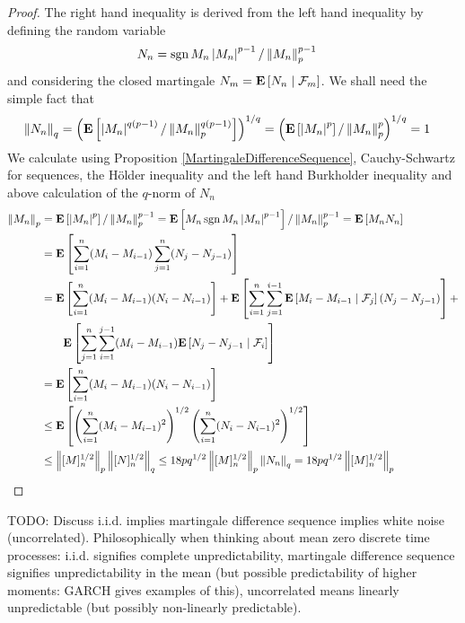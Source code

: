 \begin{proof}
The right hand inequality is derived from the left hand inequality by defining the random variable
\begin{align*}
N_n &= \sgn{M_n} \abs{M_n}^{p-1}/\norm{M_n}^{p-1}_p
\end{align*}
and considering the closed martingale $N_{m} = \cexpectationlong{\mathcal{F}_m}{N_n}$.  We shall need the simple fact that
\begin{align*}
\norm{N_n}_q &= \left( \expectation{ \abs{M_n}^{q(p-1)}/\norm{M_n}^{q(p-1)}_p} \right)^{1/q}
= \left( \expectation{ \abs{M_n}^{p}}/\norm{M_n}^{p}_p \right)^{1/q} = 1
\end{align*}
We calculate using Proposition \ref{MartingaleDifferenceSequence}, Cauchy-Schwartz for sequences, the H\"{o}lder inequality and
the left hand Burkholder inequality and above calculation of the $q$-norm of $N_n$
\begin{align*}
\norm{M_n}_p 
&= \expectation{\abs{M_n}^p}/\norm{M_n}^{p-1}_p 
= \expectation{M_n \sgn{M_n} \abs{M_n}^{p-1}} /\norm{M_n}^{p-1}_p
=\expectation{M_n N_n } \\
&= \expectation{\sum_{i=1}^n (M_i-M_{i-1}) \sum_{j=1}^n (N_j - N_{j-1})} \\
&=\expectation{\sum_{i=1}^n (M_i-M_{i-1}) (N_i - N_{i-1})} + 
\expectation{\sum_{i=1}^n \sum_{j=1}^{i-1} \cexpectationlong{\mathcal{F}_{j}}{M_i-M_{i-1}} (N_j - N_{j-1})} + \\
&\qquad \expectation{\sum_{j=1}^n \sum_{i=1}^{j-1} (M_i-M_{i-1}) \cexpectationlong{\mathcal{F}_i}{N_j - N_{j-1}}} \\
&=\expectation{\sum_{i=1}^n (M_i-M_{i-1}) (N_i - N_{i-1})} \\
&\leq \expectation{\left( \sum_{i=1}^n (M_i-M_{i-1})^2 \right )^{1/2} \left (\sum_{i=1}^n (N_i - N_{i-1})^2 \right )^{1/2}} \\
&\leq \norm{[M]^{1/2}_n}_p \norm{[N]^{1/2}_n}_q 
\leq 18 p q^{1/2} \norm{[M]^{1/2}_n}_p \norm{N_n}_q 
= 18 p q^{1/2} \norm{[M]^{1/2}_n}_p 
\end{align*}
\end{proof}

TODO: Discuss i.i.d. implies martingale difference sequence implies white noise (uncorrelated). Philosophically when thinking about mean zero discrete time processes: i.i.d. signifies complete unpredictability, martingale difference sequence signifies unpredictability in the mean (but possible predictability of higher moments: GARCH gives examples of this), uncorrelated means linearly unpredictable (but possibly non-linearly predictable).

